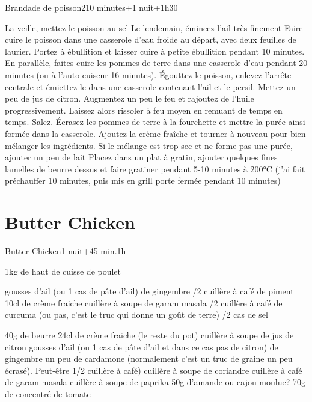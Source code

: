 {\begin{recette}{Brandade de poisson}{2}{10 minutes+1 nuit+1h30}{}
\begin{preparation}
\etape La veille, mettez le poisson au sel
\etape Le lendemain, émincez l'ail très finement 
\etape Faire cuire le poisson dans une casserole d'eau froide au départ, avec deux feuilles de laurier. Portez à ébullition et 
laisser 
cuire à petite ébullition pendant 10 minutes.
\etape En parallèle, faites cuire les pommes de terre dans une casserole d'eau pendant 20 minutes (ou à l'auto-cuiseur 16 
minutes).
\etape Égouttez le poisson, enlevez l'arrête centrale et émiettez-le dans une casserole contenant l'ail et le persil. Mettez un 
peu de jus de citron. Augmentez un peu le feu et rajoutez de l'huile progressivement. Laissez alors rissoler à feu moyen en 
remuant de temps en temps. Salez.
\etape Écrasez les pommes de terre à la fourchette et mettre la purée ainsi formée dans la casserole.
\etape Ajoutez la crème fraîche et tourner à nouveau pour bien mélanger les ingrédients. Si le mélange est trop sec et ne forme 
pas une purée, ajouter un peu de lait
\etape Placez dans un plat à gratin, ajouter quelques fines lamelles de beurre dessus et faire gratiner pendant 5-10 minutes à 
200°C (j'ai fait préchauffer 10 minutes, puis mis en grill porte fermée pendant 10 minutes)
\end{preparation}
\end{recette}

\section{Butter Chicken}
\begin{recette}{Butter Chicken}{}{1 nuit+45 min.}{1h}
\begin{ingredients}
\ingredient 1kg de haut de cuisse de poulet

 gousses d'ail (ou 1 cas de pâte d'ail)
\ingredient 2cm de gingembre
/2 cuillère à café de piment
\ingredient 10cl de crème fraiche
 cuillère à soupe de garam masala
/2 cuillère à café de curcuma (ou pas, c'est le truc qui donne un goût de terre)
/2 cas de sel

\ingredient 40g de beurre
\ingredient 24cl de crème fraiche (le reste du pot)
 cuillère à soupe de jus de citron
 gousses d'ail (ou 1 cas de pâte d'ail et dans ce cas pas de citron)
\ingredient 2cm de gingembre
\ingredient un peu de cardamone (normalement c'est un truc de graine un peu écrasé). Peut-être 1/2 cuillère à café)
 cuillère à soupe de coriandre
 cuillère à café de garam masala
 cuillère à soupe de paprika
\ingredient 50g d'amande ou cajou moulue?
\ingredient 70g de concentré de tomate
\end{ingredients}


\end{recette}}
